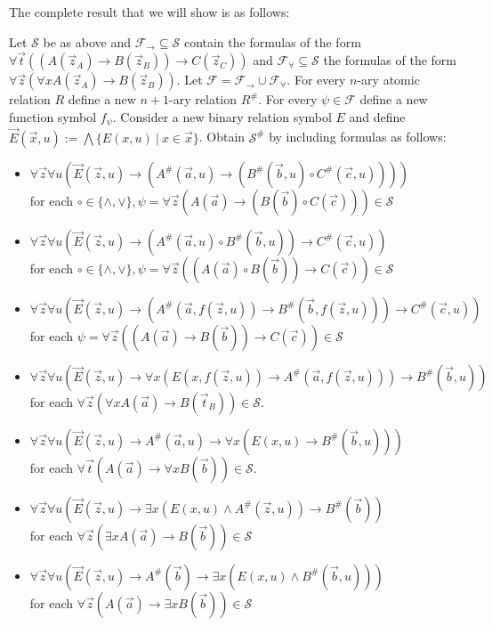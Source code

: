 \documentclass[a4paper,UKenglish,cleveref, autoref, thm-restate]{lipics-v2021}
\begin{document}
The complete result that we will show is as follows:
\begin{theorem}\label{fullFOtranslation}
	Let $\mathcal S$ be as above and $\mathcal F_\to\subseteq\mathcal S$ contain the formulas of the form $\forall \vec t((A(\vec z_A)\to B(\vec z_B))\to C(\vec z_C))$ and $\mathcal F_\forall\subseteq\mathcal S$ the formulas of the form $\forall \vec z(\forall xA(\vec z_A)\to B(\vec z_B))$. Let $\mathcal F = \mathcal F_\to\cup\mathcal F_\forall$. For every $n$-ary atomic relation $R$ define a new $n+1$-ary relation $R^\#$. For every $\psi\in\mathcal F$ define a new function symbol $f_\psi$. Consider a new binary relation symbol $E$ and define $\vec E(\vec x, u) := \bigwedge\{E(x, u)\:|\:x\in\vec x\}$. Obtain $\mathcal S^\#$ by including formulas as follows:
	\begin{itemize}
		\item $\forall \vec z\forall u(\vec E(\vec z, u)\to (A^\#(\vec a, u)\to (B^\#(\vec b, u)\circ C^\#(\vec c, u))))$\\for each $\circ\in\{\wedge, \vee\}, \psi = \forall \vec z(A(\vec a)\to (B(\vec b)\circ C(\vec c)))\in\mathcal S$
		\item $\forall \vec z\forall u(\vec E(\vec z, u)\to (A^\#(\vec a, u)\circ B^\#(\vec b, u))\to C^\#(\vec c, u))$\\for each $\circ\in\{\wedge, \vee\}, \psi = \forall \vec z((A(\vec a)\circ B(\vec b))\to C(\vec c))\in\mathcal S$
		\item $\forall \vec z\forall u(\vec E(\vec z, u)\to(A^\#(\vec a, f(\vec z, u))\to B^\#(\vec b, f(\vec z, u)))\to C^\#(\vec c, u))$ for each $\psi = \forall \vec z((A(\vec a)\to B(\vec b))\to C(\vec c))\in\mathcal S$
		\item  $\forall \vec z\forall u(\vec E(\vec z, u)\to \forall x(E(x, f(\vec z, u))\to A^\#(\vec a, f(\vec z, u)))\to B^\#(\vec b, u))$\\for each $\forall \vec z(\forall xA(\vec a)\to B(\vec t_B))\in\mathcal S$.
		\item $\forall \vec z\forall u(\vec E(\vec z, u)\to A^\#(\vec a, u)\to \forall x(E(x, u)\to B^\#(\vec b, u)))$\\for each $\forall \vec t(A(\vec a)\to \forall xB(\vec b))\in\mathcal S$.
		\item $\forall \vec z\forall u(\vec E(\vec z, u)\to \exists x(E(x, u)\wedge A^\#(\vec z, u))\to B^\#(\vec b))$\\for each $\forall \vec z(\exists xA(\vec a)\to B(\vec b))\in\mathcal S$
		\item $\forall \vec z\forall u(\vec E(\vec z, u)\to A^\#(\vec b)\to \exists x(E(x, u)\wedge B^\#(\vec b, u)))$\\for each $\forall \vec z(A(\vec a)\to \exists xB(\vec b))\in\mathcal S$

\end{itemize}
\end{theorem}
\end{document}
